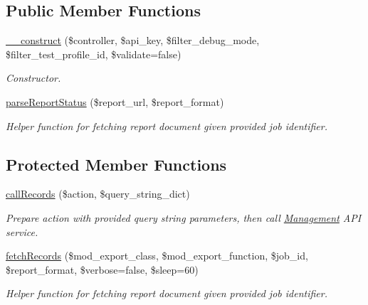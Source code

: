 \subsection*{Public Member Functions}
\begin{DoxyCompactItemize}
\item 
\hyperlink{classTune_1_1Management_1_1Reports_1_1ReportsBase_a09c4290191dba390e46ba730ce564cee}{\-\_\-\-\_\-construct} (\$controller, \$api\-\_\-key, \$filter\-\_\-debug\-\_\-mode, \$filter\-\_\-test\-\_\-profile\-\_\-id, \$validate=false)
\begin{DoxyCompactList}\small\item\em Constructor. \end{DoxyCompactList}\item 
\hyperlink{classTune_1_1Management_1_1Reports_1_1ReportsBase_a5cebfc222eef4019fcf3a428de5adcfe}{parse\-Report\-Status} (\$report\-\_\-url, \$report\-\_\-format)
\begin{DoxyCompactList}\small\item\em Helper function for fetching report document given provided job identifier. \end{DoxyCompactList}\end{DoxyCompactItemize}
\subsection*{Protected Member Functions}
\begin{DoxyCompactItemize}
\item 
\hyperlink{classTune_1_1Management_1_1Reports_1_1ReportsBase_aecd8c7a22f4740abab9bd0feabc15387}{call\-Records} (\$action, \$query\-\_\-string\-\_\-dict)
\begin{DoxyCompactList}\small\item\em Prepare action with provided query string parameters, then call \hyperlink{namespaceTune_1_1Management}{Management} A\-P\-I service. \end{DoxyCompactList}\item 
\hyperlink{classTune_1_1Management_1_1Reports_1_1ReportsBase_ac6c3a238e99b0dfb88a83fc70924493b}{fetch\-Records} (\$mod\-\_\-export\-\_\-class, \$mod\-\_\-export\-\_\-function, \$job\-\_\-id, \$report\-\_\-format, \$verbose=false, \$sleep=60)
\begin{DoxyCompactList}\small\item\em Helper function for fetching report document given provided job identifier. \end{DoxyCompactList}\end{DoxyCompactItemize}
